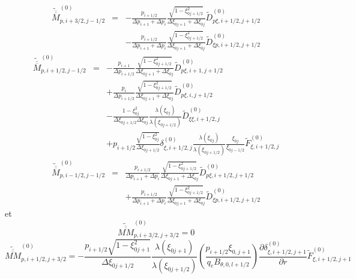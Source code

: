 \begin{eqnarray*}
\widetilde{\overline{\overline{M}}}_{p,i+3/2,j-1/2}^{\left(0\right)} & = & -\frac{p_{i+1/2}}{\Delta p_{i+1}+\Delta p_{i}}\frac{\sqrt{1-\xi_{0j+1/2}^{2}}}{\Delta\xi_{0j+1}+\Delta\xi_{0j}}\widetilde{D}_{p\xi,i+1/2,j+1/2}^{\left(0\right)}\\
 &  & -\frac{p_{i+1/2}}{\Delta p_{i+1}+\Delta p_{i}}\frac{\sqrt{1-\xi_{0j+1/2}^{2}}}{\Delta\xi_{0j+1}+\Delta\xi_{0j}}\widetilde{D}_{\xi p,i+1/2,j+1/2}^{\left(0\right)}\end{eqnarray*}
\begin{eqnarray*}
\widetilde{\overline{\overline{M}}}_{p,i+1/2,j-1/2}^{\left(0\right)} & = & -\frac{p_{i+1}}{\Delta p_{i+1/2}}\frac{\sqrt{1-\xi_{0j+1/2}^{2}}}{\Delta\xi_{0j+1}+\Delta\xi_{0j}}\widetilde{D}_{p\xi,i+1,j+1/2}^{\left(0\right)}\\
 &  & +\frac{p_{i}}{\Delta p_{i+1/2}}\frac{\sqrt{1-\xi_{0j+1/2}^{2}}}{\Delta\xi_{0j+1}+\Delta\xi_{0j}}\widetilde{D}_{p\xi,i,j+1/2}^{\left(0\right)}\\
 &  & -\frac{1-\xi_{0j}^{2}}{\Delta\xi_{0j+1/2}\Delta\xi_{0j}}\frac{\lambda\left(\xi_{0j}\right)}{\lambda\left(\xi_{0j+1/2}\right)}\widetilde{D}_{\xi\xi,i+1/2,j}^{\left(0\right)}\\
 &  & +p_{i+1/2}\frac{\sqrt{1-\xi_{0j}^{2}}}{\Delta\xi_{0j+1/2}}\delta_{\xi,i+1/2,j}^{\left(0\right)}\frac{\lambda\left(\xi_{0j}\right)}{\lambda\left(\xi_{0j+1/2}\right)}\frac{\xi_{0j}}{\xi_{0j-1/2}}\widetilde{F}_{\xi,i+1/2,j}^{\left(0\right)}\end{eqnarray*}
\begin{eqnarray*}
\widetilde{\overline{\overline{M}}}_{p,i-1/2,j-1/2}^{\left(0\right)} & = & \frac{p_{i+1/2}}{\Delta p_{i+1}+\Delta p_{i}}\frac{\sqrt{1-\xi_{0j+1/2}^{2}}}{\Delta\xi_{0j+1}+\Delta\xi_{0j}}\widetilde{D}_{p\xi,i+1/2,j+1/2}^{\left(0\right)}\\
 &  & +\frac{p_{i+1/2}}{\Delta p_{i+1}+\Delta p_{i}}\frac{\sqrt{1-\xi_{0j+1/2}^{2}}}{\Delta\xi_{0j+1}+\Delta\xi_{0j}}\widetilde{D}_{\xi p,i+1/2,j+1/2}^{\left(0\right)}\end{eqnarray*}
 et \[
\widetilde{\overline{\overline{MM}}}_{p,i+3/2,j+3/2}^{\left(0\right)}=0\]
 \[
\widetilde{\overline{\overline{MM}}}_{p,i+1/2,j+3/2}^{\left(0\right)}=-\frac{p_{i+1/2}\sqrt{1-\xi_{0j+1}^{2}}}{\Delta\xi_{0j+1/2}}\frac{\lambda\left(\xi_{0j+1}\right)}{\lambda\left(\xi_{0j+1/2}\right)}\left(\frac{p_{i+1/2}\xi_{0,j+1}}{q_{e}B_{\theta,0,l+1/2}}\right)\frac{\partial\delta_{\xi,i+1/2,j+1}^{(0)}}{\partial r}\widetilde{F}_{\xi,i+1/2,j+1}^{\left(0\right)}\]
